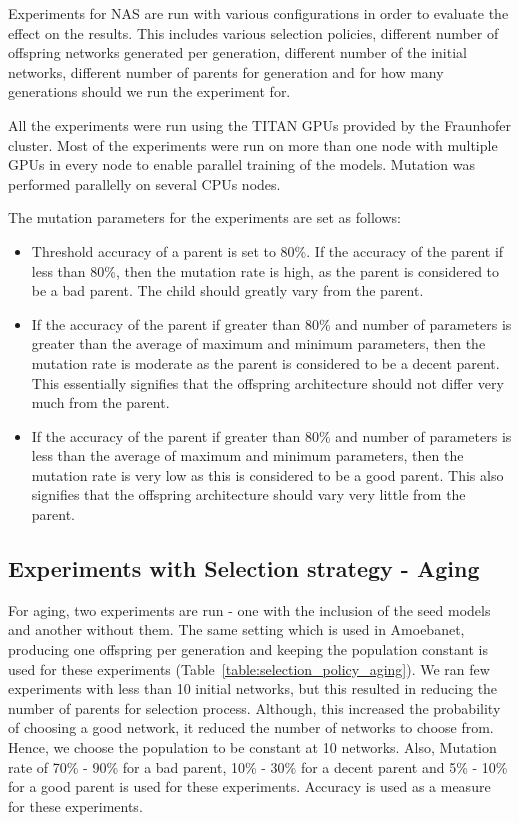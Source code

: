 Experiments for NAS are run with various configurations in order to evaluate the effect on the results. This includes various selection policies, different number of offspring networks generated per generation, different number of the initial networks, different number of parents for generation and for how many generations should we run the experiment for.

All the experiments were run using the TITAN GPUs provided by the Fraunhofer cluster. Most of the experiments were run on more than one node with multiple GPUs in every node to enable parallel training of the models. Mutation was performed parallelly on several CPUs nodes.

The mutation parameters for the experiments are set as follows:
\begin{itemize}
    \item Threshold accuracy of a parent is set to 80\%. If the accuracy of the parent if less than 80\%, then the mutation rate is high, as the parent is considered to be a bad parent. The child should greatly vary from the parent.
    \item If the accuracy of the parent if greater than 80\% and number of parameters is greater than the average of maximum and minimum parameters, then the mutation rate is moderate as the parent is considered to be a decent parent. This essentially signifies that the offspring architecture should not differ very much from the parent.
    \item If the accuracy of the parent if greater than 80\% and number of parameters is less than the average of maximum and minimum parameters, then the mutation rate is very low as this is considered to be a good parent. This also signifies that the offspring architecture should vary very little from the parent.
\end{itemize}

\subsection{Experiments with Selection strategy - Aging}

For aging, two experiments are run - one with the inclusion of the seed models and another without them. The same setting which is used in Amoebanet, producing one offspring per generation and keeping the population constant is used for these experiments (Table~\ref{table:selection_policy_aging}). We ran few experiments with less than 10 initial networks, but this resulted in reducing the number of parents for selection process. Although, this increased the probability of choosing a good network, it reduced the number of networks to choose from. Hence, we choose the population to be constant at 10 networks. Also, Mutation rate of 70\% - 90\% for a bad parent, 10\% - 30\% for a decent parent and 5\% - 10\% for a good parent is used for these experiments. Accuracy is used as a measure for these experiments.

